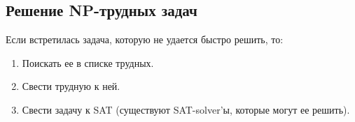 \subsection*{Решение NP-трудных задач}
Если встретилась задача, которую не удается быстро решить, то:
\begin{enumerate}
    \item Поискать ее в списке трудных.
    \item Свести трудную к ней.
    \item Свести задачу к SAT (существуют SAT-solver'ы, которые могут ее решить).
\end{enumerate}